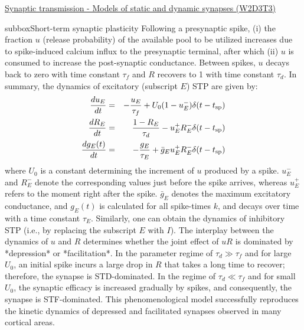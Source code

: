 \begin{textbox}{\href{https://compneuro.neuromatch.io/tutorials/W2D3_BiologicalNeuronModels/student/W2D3_Tutorial3.html}{Synaptic transmission - Models of static and dynamic synapses (W2D3T3)} }
\begin{subbox}{subbox}{Short-term synaptic plasticity}
Following a presynaptic spike, (i) the fraction $u$ (release probability) of the available pool to be utilized increases due to spike-induced calcium influx to the presynaptic terminal, after which (ii) $u$ is consumed to increase the post-synaptic conductance. Between spikes, $u$ decays back to zero with time constant $\tau_f$ and $R$ recovers to 1 with time constant $\tau_d$. In summary, the dynamics of excitatory (subscript $E$) STP are given by:
\begin{eqnarray*}
\frac{du_E}{dt} &=& -\frac{u_E}{\tau_f} + U_0(1-u_E^-)\delta(t-t_{\rm sp}) \\
\frac{dR_E}{dt} &=& \frac{1-R_E}{\tau_d} - u_E^+ R_E^- \delta(t-t_{\rm sp})  \\
\frac{dg_E(t)}{dt} &=& -\frac{g_E}{\tau_E} + \bar{g}_E u_E^+ R_E^- \delta(t-t_{\rm sp})
\end{eqnarray*}
where $U_0$ is a constant determining the increment of $u$ produced by a spike. $u_E^-$ and $R_E^-$ denote the corresponding values just before the spike arrives, whereas $u_E^+$ refers to the moment right after the spike. $\bar{g}_E$ denotes the maximum excitatory conductance, and $g_E(t)$ is calculated for all spike-times $k$, and decays over time with a time constant $\tau_{E}$. Similarly, one can obtain the dynamics of inhibitory STP (i.e., by replacing the subscript $E$ with $I$).
The interplay between the dynamics of $u$ and $R$ determines whether the joint effect of $uR$ is dominated by *depression* or *facilitation*. In the parameter regime of $\tau_d \gg \tau_f$  and for large $U_0$, an initial spike incurs a large drop in $R$ that takes a long time to recover; therefore, the synapse is STD-dominated. In the regime of $\tau_d \ll \tau_f$ and for small $U_0$, the synaptic efficacy is increased gradually by spikes, and consequently, the synapse is STF-dominated. This phenomenological model successfully reproduces the kinetic dynamics of depressed and facilitated synapses observed in many cortical areas.

\end{subbox}

\end{textbox}

